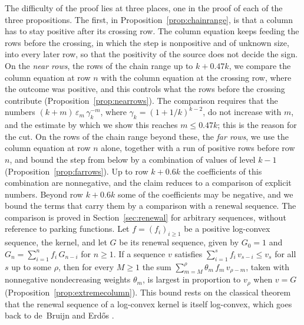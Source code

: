 \documentclass{amsart}
\theoremstyle{definition}
\theoremstyle{remark}
\numberwithin{equation}{section}
\begin{document}
The difficulty of the proof lies at three places, one in the proof of each of the three propositions. The first, in Proposition~\ref{prop:chainrange}, is that a column has to stay positive after its crossing row. The column equation keeps feeding the rows before the crossing, in which the step is nonpositive and of unknown size, into every later row, so that the positivity of the source does not decide the sign. On the \emph{near rows}, the rows of the chain range up to $k+0.47k$, we compare the column equation at row $n$ with the column equation at the crossing row, where the outcome was positive, and this controls what the rows before the crossing contribute (Proposition~\ref{prop:nearrows}). The comparison requires that the numbers $(k+m)\,\varepsilon_m\,\gamma_k^{-m}$, where $\gamma_k=(1+1/k)^{k-2}$, do not increase with $m$, and the estimate by which we show this reaches $m\le 0.47k$; this is the reason for the cut. On the rows of the chain range beyond these, the \emph{far rows}, we use the column equation at row $n$ alone, together with a run of positive rows before row $n$, and bound the step from below by a combination of values of level $k-1$ (Proposition~\ref{prop:farrows}). Up to row $k+0.6k$ the coefficients of this combination are nonnegative, and the claim reduces to a comparison of explicit numbers. Beyond row $k+0.6k$ some of the coefficients may be negative, and we bound the terms that carry them by a comparison with a renewal sequence. The comparison is proved in Section~\ref{sec:renewal} for arbitrary sequences, without reference to parking functions. Let $f=(f_i)_{i\ge 1}$ be a positive log-convex sequence, the kernel, and let $G$ be its renewal sequence, given by $G_0=1$ and $G_n=\sum_{i=1}^{n}f_i\,G_{n-i}$ for $n\ge 1$. If a sequence $v$ satisfies $\sum_{i=1}^{s}f_i\,v_{s-i}\le v_s$ for all $s$ up to some $\rho$, then for every $M\ge 1$ the sum $\sum_{m=M}^{\rho}\theta_m\,f_m\,v_{\rho-m}$, taken with nonnegative nondecreasing weights $\theta_m$, is largest in proportion to $v_\rho$ when $v=G$ (Proposition~\ref{prop:extremecolumn}). This bound rests on the classical theorem that the renewal sequence of a log-convex kernel is itself log-convex, which goes back to de~Bruijn and Erd\H{o}s \cite[Theorem~1]{debruijn1953}.
\end{document}
